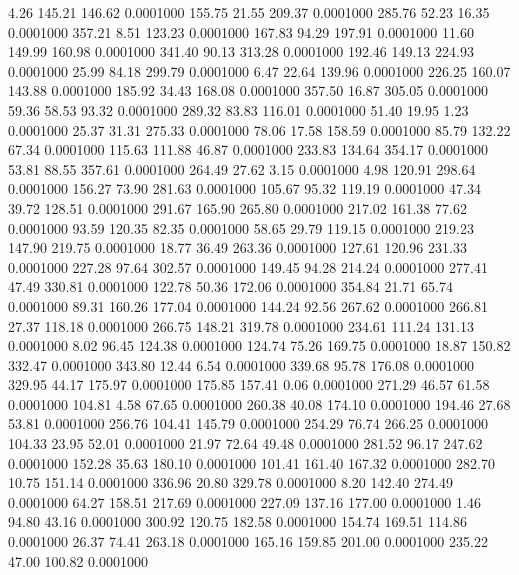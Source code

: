    4.26  145.21  146.62   0.0001000
 155.75   21.55  209.37   0.0001000
 285.76   52.23   16.35   0.0001000
 357.21    8.51  123.23   0.0001000
 167.83   94.29  197.91   0.0001000
  11.60  149.99  160.98   0.0001000
 341.40   90.13  313.28   0.0001000
 192.46  149.13  224.93   0.0001000
  25.99   84.18  299.79   0.0001000
   6.47   22.64  139.96   0.0001000
 226.25  160.07  143.88   0.0001000
 185.92   34.43  168.08   0.0001000
 357.50   16.87  305.05   0.0001000
  59.36   58.53   93.32   0.0001000
 289.32   83.83  116.01   0.0001000
  51.40   19.95    1.23   0.0001000
  25.37   31.31  275.33   0.0001000
  78.06   17.58  158.59   0.0001000
  85.79  132.22   67.34   0.0001000
 115.63  111.88   46.87   0.0001000
 233.83  134.64  354.17   0.0001000
  53.81   88.55  357.61   0.0001000
 264.49   27.62    3.15   0.0001000
   4.98  120.91  298.64   0.0001000
 156.27   73.90  281.63   0.0001000
 105.67   95.32  119.19   0.0001000
  47.34   39.72  128.51   0.0001000
 291.67  165.90  265.80   0.0001000
 217.02  161.38   77.62   0.0001000
  93.59  120.35   82.35   0.0001000
  58.65   29.79  119.15   0.0001000
 219.23  147.90  219.75   0.0001000
  18.77   36.49  263.36   0.0001000
 127.61  120.96  231.33   0.0001000
 227.28   97.64  302.57   0.0001000
 149.45   94.28  214.24   0.0001000
 277.41   47.49  330.81   0.0001000
 122.78   50.36  172.06   0.0001000
 354.84   21.71   65.74   0.0001000
  89.31  160.26  177.04   0.0001000
 144.24   92.56  267.62   0.0001000
 266.81   27.37  118.18   0.0001000
 266.75  148.21  319.78   0.0001000
 234.61  111.24  131.13   0.0001000
   8.02   96.45  124.38   0.0001000
 124.74   75.26  169.75   0.0001000
  18.87  150.82  332.47   0.0001000
 343.80   12.44    6.54   0.0001000
 339.68   95.78  176.08   0.0001000
 329.95   44.17  175.97   0.0001000
 175.85  157.41    0.06   0.0001000
 271.29   46.57   61.58   0.0001000
 104.81    4.58   67.65   0.0001000
 260.38   40.08  174.10   0.0001000
 194.46   27.68   53.81   0.0001000
 256.76  104.41  145.79   0.0001000
 254.29   76.74  266.25   0.0001000
 104.33   23.95   52.01   0.0001000
  21.97   72.64   49.48   0.0001000
 281.52   96.17  247.62   0.0001000
 152.28   35.63  180.10   0.0001000
 101.41  161.40  167.32   0.0001000
 282.70   10.75  151.14   0.0001000
 336.96   20.80  329.78   0.0001000
   8.20  142.40  274.49   0.0001000
  64.27  158.51  217.69   0.0001000
 227.09  137.16  177.00   0.0001000
   1.46   94.80   43.16   0.0001000
 300.92  120.75  182.58   0.0001000
 154.74  169.51  114.86   0.0001000
  26.37   74.41  263.18   0.0001000
 165.16  159.85  201.00   0.0001000
 235.22   47.00  100.82   0.0001000
